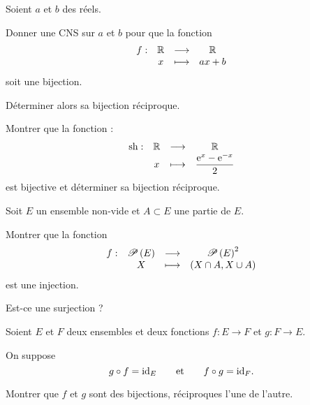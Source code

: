 \begin{corr}
\end{corr}

\begin{exo}[Exercice 7]
Soient \(a\) et \(b\) des réels.

Donner une CNS sur \(a\) et \(b\) pour que la fonction \[\begin{array}[t]{cccc}f : & \mathbb{R} & \longrightarrow & \mathbb{R} \\ & x & \longmapsto & ax+b\end{array}\] soit une bijection.

Déterminer alors sa bijection réciproque.
\end{exo}

\begin{corr}
\end{corr}

\begin{exo}[Exercice 8]
Montrer que la fonction  : \[\begin{array}[t]{cccc}\operatorname{sh} : & \mathbb{R} & \longrightarrow & \mathbb{R} \\ & x & \longmapsto & \dfrac{\mathrm{e}^{x}-\mathrm{e}^{-x}}{2}\end{array}\] est bijective et déterminer sa bijection réciproque.
\end{exo}

\begin{corr}
\end{corr}

\begin{exo}[Exercice 9]
Soit \(E\) un ensemble non-vide et \(A\subset E\) une partie de \(E\).

Montrer que la fonction \[\begin{array}[t]{cccc}f : & \mathscr{P}\left(E\right) & \longrightarrow & \mathscr{P}\left(E\right)^2 \\ & X & \longmapsto & \left(X\cap A,X\cup A\right)\end{array}\] est une injection.

Est-ce une surjection ?
\end{exo}

\begin{corr}
\end{corr}

\begin{exo}[Exercice 10]
Soient \(E\) et \(F\) deux ensembles et deux fonctions \(f:E\to F\) et \(g:F\to E\).

On suppose \[g\circ f=\mathrm{id}_{E}\qquad\text{et}\qquad f\circ g=\mathrm{id}_{F}.\]

Montrer que \(f\) et \(g\) sont des bijections, réciproques l'une de l'autre.
\end{exo}

\begin{corr}
\end{corr}

